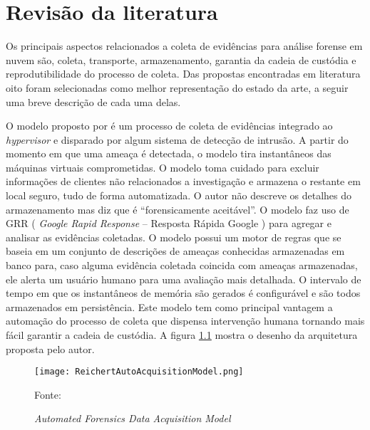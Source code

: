 \chapter{Revisão da literatura}
\label{chp:revisão}


Os principais aspectos relacionados a coleta de evidências para análise forense em nuvem são, coleta, transporte, armazenamento, garantia da cadeia de custódia e reprodutibilidade do processo de coleta. 
%
Das propostas encontradas em literatura oito foram selecionadas como melhor representação do estado da arte, a seguir uma breve descrição de cada uma delas.

%
O modelo proposto por \cite{ReichertAutoAcquisition:2015} é um processo de coleta de evidências integrado ao \textit{hypervisor} e disparado por algum sistema de detecção de intrusão. 
%
A partir do momento em que uma ameaça é detectada, o modelo tira instantâneos das máquinas virtuais comprometidas. O modelo toma cuidado para excluir informações de clientes não relacionados a investigação e armazena o restante em local seguro, tudo de forma automatizada.
%
O autor não descreve os detalhes do armazenamento mas diz que é ``forensicamente aceitável''.
%
O modelo faz uso de GRR ( \textit{Google Rapid Response} -- Resposta Rápida Google ) para agregar e analisar as evidências coletadas. 
%
O modelo possui um motor de regras que se baseia em um conjunto de descrições de ameaças conhecidas armazenadas em banco para, caso alguma evidência coletada coincida com ameaças armazenadas, ele alerta um usuário humano para uma avaliação mais detalhada.
%
O intervalo de tempo em que os instantâneos de memória são gerados é configurável e são todos armazenados em persistência.
%
Este modelo tem como principal vantagem a automação do processo de coleta que dispensa intervenção humana tornando mais fácil garantir a cadeia de custódia. 
%
A figura \ref{fig:ReichertAutoAcquisitionModel} mostra o desenho da arquitetura proposta pelo autor.

\begin{figure}[htb!]
\footnotesize
\caption{\textit{Automated Forensics Data Acquisition Model}}
\texttt{[image: ReichertAutoAcquisitionModel.png]}
\centering
\label{fig:ReichertAutoAcquisitionModel}
\begin{center}
Fonte: \cite{ReichertAutoAcquisition:2015} 
\end{center}
\end{figure}

